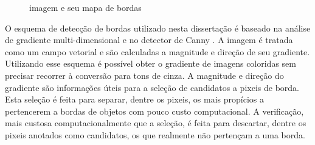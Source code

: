 \begin{figure}[h]
  \centering
  \hfill
  \caption{imagem e seu mapa de bordas}
  \label{exemploborda}
\end{figure}




O esquema de detecção de bordas utilizado nesta dissertação é baseado na análise de gradiente multi-dimensional \cite{borda00} e no detector de Canny \cite{canny}. A imagem é tratada como um campo vetorial e são calculadas a magnitude e direção de seu 	gradiente. Utilizando esse esquema é possível obter o gradiente de imagens coloridas sem precisar recorrer à conversão para tons de cinza. A magnitude e direção do gradiente são informações úteis para a seleção de candidatos a pixeis de borda. Esta seleção é feita para separar, dentre os pixeis, os mais propícios a pertencerem a bordas de objetos com pouco custo computacional. A verificação, mais custosa computacionalmente que a seleção, é feita para descartar, dentre os pixeis anotados como candidatos, os que realmente não pertençam a uma borda.

